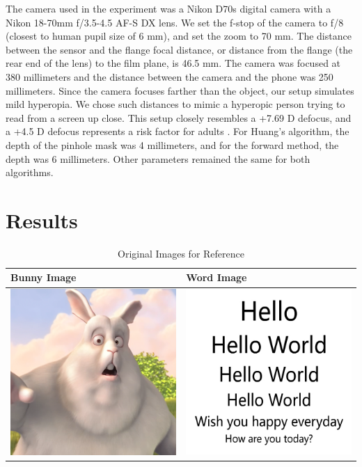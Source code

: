 The camera used in the experiment was a Nikon D70s digital camera with a Nikon 18-70mm f/3.5-4.5 AF-S DX lens. We set the f-stop of the camera to f/8 (closest to human pupil size of 6 mm), and set the zoom to 70 mm. The distance between the sensor and the flange focal distance, or distance from the flange (the rear end of the lens) to the film plane, is 46.5 mm. The camera was focused at 380 millimeters and the distance between the camera and the phone was 250 millimeters. Since the camera focuses farther than the object, our setup simulates mild hyperopia. We chose such distances to mimic a hyperopic person trying to read from a screen up close. This setup closely resembles a +7.69 D defocus, and a +4.5 D defocus represents a risk factor for adults \cite{iscreenvision.com}. For Huang’s algorithm, the depth of the pinhole mask was 4 millimeters, and for the forward method, the depth was 6 millimeters. Other parameters remained the same for both algorithms. 

\section{Results} 

\begin{table}[!h]
    \caption{Original Images for Reference}
    \begin{tabular}{| l | l }
    \hline Bunny Image & Word Image \\ \hline
      \includegraphics[width=3in]{chapters/chapter5/images/Clean_Images/0084_820.png} &
      \includegraphics[width=3in]{chapters/chapter5/images/Clean_Images/Hello.png} \\ \hline
    \end{tabular}
\end{table}


